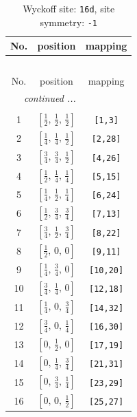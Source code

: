 \documentclass[fleqn,8pt]{jsarticle}
\begin{document}
\renewcommand{\arraystretch}{1.2}
\begin{longtable}{ccc}
\caption{Wyckoff site: {\tt 16d}, site symmetry: {\tt -1}}
 \\
 \hline \hline
No. & position & mapping \\ \hline \endfirsthead

\multicolumn{2}{l}{\tablename\ \thetable{}} \\
 \hline \hline
No. & position & mapping \\ \hline \endhead

 \hline \hline
\multicolumn{2}{r}{\footnotesize\it continued ...} \\ \endfoot

 \hline \hline
\multicolumn{2}{r}{} \\ \endlastfoot

1 & $\left[ \frac{1}{2},\, \frac{1}{2},\, \frac{1}{2} \right]$ & {\tt [1,3]} \\ \hline
2 & $\left[ \frac{1}{4},\, \frac{1}{4},\, \frac{1}{2} \right]$ & {\tt [2,28]} \\ \hline
3 & $\left[ \frac{3}{4},\, \frac{3}{4},\, \frac{1}{2} \right]$ & {\tt [4,26]} \\ \hline
4 & $\left[ \frac{1}{2},\, \frac{1}{4},\, \frac{1}{4} \right]$ & {\tt [5,15]} \\ \hline
5 & $\left[ \frac{1}{4},\, \frac{1}{2},\, \frac{1}{4} \right]$ & {\tt [6,24]} \\ \hline
6 & $\left[ \frac{1}{2},\, \frac{3}{4},\, \frac{3}{4} \right]$ & {\tt [7,13]} \\ \hline
7 & $\left[ \frac{3}{4},\, \frac{1}{2},\, \frac{3}{4} \right]$ & {\tt [8,22]} \\ \hline
8 & $\left[ \frac{1}{2},\, 0,\, 0 \right]$ & {\tt [9,11]} \\ \hline
9 & $\left[ \frac{1}{4},\, \frac{3}{4},\, 0 \right]$ & {\tt [10,20]} \\ \hline
10 & $\left[ \frac{3}{4},\, \frac{1}{4},\, 0 \right]$ & {\tt [12,18]} \\ \hline
11 & $\left[ \frac{1}{4},\, 0,\, \frac{3}{4} \right]$ & {\tt [14,32]} \\ \hline
12 & $\left[ \frac{3}{4},\, 0,\, \frac{1}{4} \right]$ & {\tt [16,30]} \\ \hline
13 & $\left[ 0,\, \frac{1}{2},\, 0 \right]$ & {\tt [17,19]} \\ \hline
14 & $\left[ 0,\, \frac{1}{4},\, \frac{3}{4} \right]$ & {\tt [21,31]} \\ \hline
15 & $\left[ 0,\, \frac{3}{4},\, \frac{1}{4} \right]$ & {\tt [23,29]} \\ \hline
16 & $\left[ 0,\, 0,\, \frac{1}{2} \right]$ & {\tt [25,27]} \\
\end{longtable}
\end{document}
